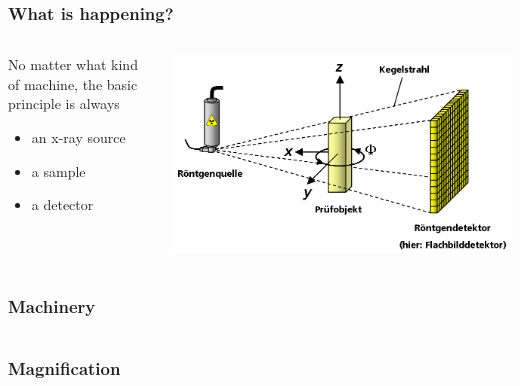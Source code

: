 \begin{frame}
  \frametitle{What is happening?}
  \begin{columns}
    \begin{column}{0.5\linewidth}%
      No matter what kind of machine, the basic principle is always
      \begin{itemize}
        \item an x-ray source
        \item a sample
        \item a detector
      \end{itemize}
    \end{column}%
    \begin{column}{0.5\linewidth}%
      \centering%
      \includegraphics[width=\imagewidth]{./images/3D_Computed_Tomography}%
    \end{column}%
  \end{columns}%
\end{frame}

\begin{frame}
  \frametitle{Machinery}
  \begin{columns}
    \begin{column}{0.5\textwidth}
      \centering
      
    \end{column}
    \begin{column}{0.5\textwidth}
      \centering
      \only<1>{}%
      \only<2|handout:0>{}%
    \end{column}
  \end{columns}
\end{frame}

\begin{frame}
  \frametitle{Magnification}
  \centering
\end{frame}

